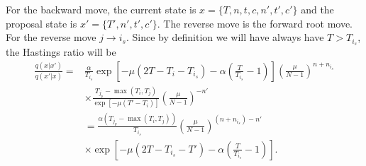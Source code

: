 \documentclass[a4paper,11pt]{article}
\begin{document}
For the backward move, the current state is $x=\{T,n,t,c,n',t',c'\}$
and the proposal state is $x'=\{T',n',t',c'\}$. The reverse move is
the forward root move. For the reverse move $j\rightarrow i_s$. Since
by definition we will have always have $T>T_{i_s}$, the Hastings ratio
will be
\begin{align}
  \frac{q(x|x')}{q(x'|x)}
=&
\frac{\alpha}{T_{i_s}}\exp\left[-\mu(2T-T_i-T_{i_s})-\alpha\left(\frac{T}{T_{i_s}}-1\right)\right]\left(\frac{\mu}{N-1}\right)^{n+n_{i_s}}\nonumber\\
&\times
\frac{T_{j_p}-\max(T_i,T_j)}{\exp[-\mu(T'-T_i)]}\left(\frac{\mu}{N-1}\right)^{-n'}\nonumber\\
&=\frac{\alpha(T_{j_p}-\max(T_i,T_j))}{T_{i_s}}\left(\frac{\mu}{N-1}\right)^{(n+n_{i_s})-n'}\nonumber\\
&\times\exp\left[-\mu(2T-T_{i_s}-T')-\alpha\left(\frac{T}{T_{i_s}}-1\right)\right].
\end{align}
\end{document}

